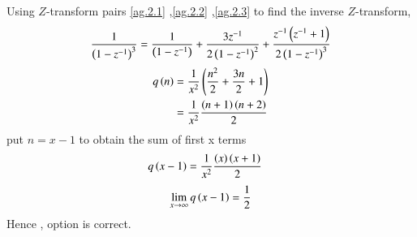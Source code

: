 \documentclass[beamer]{IEEEtran}
\theoremstyle{remark}
\begin{document}
Using $Z$-transform pairs \eqref{ag.2.1} ,\eqref{ag.2.2} ,\eqref{ag.2.3} to find the inverse $Z$-transform,
\begin{align}
	\frac{1}{\left(1-z^{-1}\right)^{3}} = \frac{1}{\left(1-z^{-1}\right)}+\frac{3z^{-1}}{2\left(1-z^{-1}\right)^2}+\frac{z^{-1}\left(z^{-1}+1\right)}{2\left(1-z^{-1}\right)^3}
\end{align}
\begin{align}
	q\left(n\right)&=\frac{1}{x^2}\left(\frac{n^2}{2}+\frac{3n}{2}+1\right) \\
	&=\frac{1}{x^2}\frac{\left(n+1\right)\left(n+2\right)}{2}
 \end{align}
 put $n=x-1$ to obtain the sum of first x terms
 \begin{align}
	q\left(x-1\right)&=\frac{1}{x^2}\frac{\left(x\right)\left(x+1\right)}{2} 
\end{align}
\begin{align}
    \lim_{x\to\infty}q\left(x-1\right)=\frac{1}{2}
\end{align}
Hence , option  is correct.
\end{document}
